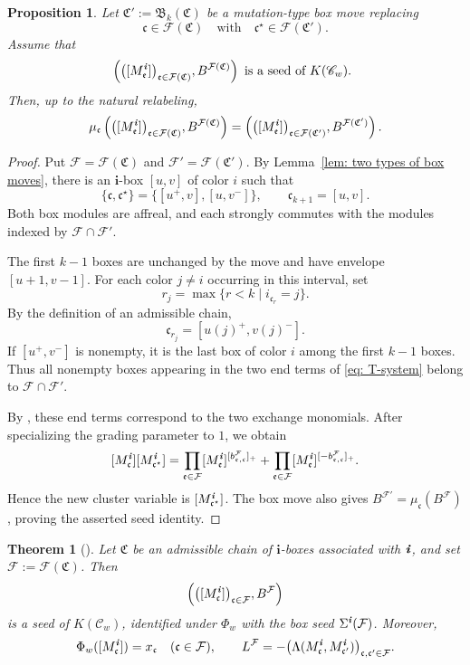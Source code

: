 \documentclass[12pt, leqno]{amsart}
\numberwithin{equation}{section}
\theoremstyle{plain}
\newtheorem{proposition}[lemma]{Proposition}
\newtheorem{theorem}[lemma]{Theorem}
\theoremstyle{definition}
\newcommand{\seteq}{\mathbin{:=}}
\newcommand{\ii}{ \textbf{\textit{i}}}
\newcommand{\frakB}{\mathfrak{B}}
\newcommand{\frakC}{\mathfrak{C}}
\newcommand{\frakc}{\mathfrak{c}}
\newcommand{\frake}{\mathfrak{e}}
\newcommand{\bfi}{\mathbf{i}}
\newcommand{\calF}{\mathcal{F}}
\newcommand{\scrC}{\mathscr{C}}
\begin{document}
\begin{proposition}\label{prop: box moves are categorical mutations}
Let $\frakC'\seteq\frakB_k(\frakC)$ be a mutation-type box move replacing
\[
\frakc\in\calF(\frakC) \quad\text{with}\quad \frakc^\star\in\calF(\frakC').
\]
Assume that
\[
\left(\bigl([M_\frake^\ii]\bigr)_{\frake\in\calF(\frakC)},B^{\calF(\frakC)}\right) \text{ is a seed of \(K(\scrC_w)\). }
\]
Then, up to the natural relabeling,
\[
\mu_\frakc \left( \bigl([M_\frake^\ii]\bigr)_{\frake\in\calF(\frakC)}, B^{\calF(\frakC)} \right)
= \left( \bigl([M_\frake^\ii]\bigr)_{\frake\in\calF(\frakC')}, B^{\calF(\frakC')} \right).
\]
\end{proposition}
\begin{proof}
Put \(\calF=\calF(\frakC)\) and \(\calF'=\calF(\frakC')\).
By Lemma~\ref{lem: two types of box moves}, there is an
\(\bfi\)-box \([u,v]\) of color \(i\) such that
\[
\{\frakc,\frakc^\star\}=\{[u^+,v],[u,v^-]\},
\qquad
\frakc_{k+1}=[u,v].
\]
Both box modules are affreal, and each strongly commutes with
the modules indexed by \(\calF\cap\calF'\).

The first \(k-1\) boxes are unchanged by the move and have
envelope \([u+1,v-1]\).
For each color \(j\ne i\) occurring in this interval, set  
\[
r_j=\max\{r<k\mid i_{\frakc_r}=j\}.
\]
By the definition of an admissible chain,
\[
\frakc_{r_j}=[u(j)^+,v(j)^-].
\]
If \([u^+,v^-]\) is nonempty, it is the last box of color \(i\)
among the first \(k-1\) boxes.
Thus all nonempty boxes appearing in the two end terms of
\eqref{eq: T-system} belong to \(\calF\cap\calF'\).

By \cite[(3.1)]{KK24}, these end terms correspond
to the two exchange monomials.  After specializing the grading
parameter to \(1\), we obtain
\[
[M_\frakc^\ii][M_{\frakc^\star}^\ii]
=
\prod_{\frake\in\calF}
[M_\frake^\ii]^{[b_{\frake,\frakc}^\calF]_+}
+
\prod_{\frake\in\calF}
[M_\frake^\ii]^{[-b_{\frake,\frakc}^\calF]_+}.
\]
Hence the new cluster variable is \([M_{\frakc^\star}^\ii]\).
The box move also gives
\(B^{\calF'}=\mu_\frakc(B^\calF)\), proving the asserted
seed identity.
\end{proof}


\begin{theorem}[{\cite[Theorem~5.20]{KK24}}]
\label{thm: categorical realization of box seeds}
Let \(\frakC\) be an admissible chain of \(\bfi\)-boxes associated
with \(\ii\), and set \(\calF\seteq\calF(\frakC)\).
Then
\[
\left(
\bigl([M_\frakc^\ii]\bigr)_{\frakc\in\calF},
B^\calF
\right)
\]
is a seed of \(K(\scrC_w)\), identified under \(\Phi_w\) with
the box seed \(\Sigma^\ii(\calF)\).  Moreover,
\[
\Phi_w([M_\frakc^\ii])=x_\frakc
\quad(\frakc\in\calF),
\qquad
L^\calF
=-\bigl(
\Lambda(M_\frakc^\ii,M_{\frakc'}^\ii)
\bigr)_{\frakc,\frakc'\in\calF}.
\]
\end{theorem}
\end{document}
